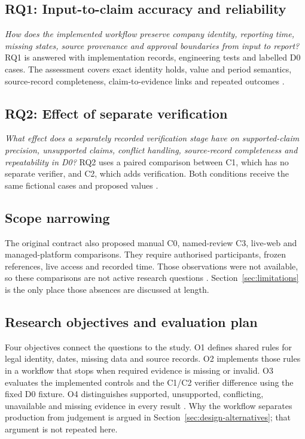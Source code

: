 \subsection*{RQ1: Input-to-claim accuracy and reliability}

\textit{How does the implemented workflow preserve company identity, reporting time, missing states,
source provenance and approval boundaries from input to report?} RQ1 is answered with implementation
records, engineering tests and labelled D0 cases. The assessment covers exact identity holds, value
and period semantics, source-record completeness, claim-to-evidence links and repeated outcomes
\citep{nikiforova2020quality,gao2023alce}.

\subsection*{RQ2: Effect of separate verification}

\textit{What effect does a separately recorded verification stage have on supported-claim precision,
unsupported claims, conflict handling, source-record completeness and repeatability in D0?} RQ2 uses
a paired comparison between C1, which has no separate verifier, and C2, which adds verification.
Both conditions receive the same fictional cases and proposed values
\citep{gao2023alce,gao2023rarr}.

\subsection*{Scope narrowing}

The original contract also proposed manual C0, named-review C3, live-web and managed-platform
comparisons. They require authorised participants, frozen references, live access and recorded time.
Those observations were not available, so these comparisons are not active research questions
\citep{amershi2019guidelines,bucinca2021forcing}. Section~\ref{sec:limitations} is the only place
those absences are discussed at length.

\subsection*{Research objectives and evaluation plan}

Four objectives connect the questions to the study. O1 defines shared rules for legal identity,
dates, missing data and source records. O2 implements those rules in a workflow that stops when
required evidence is missing or invalid. O3 evaluates the implemented controls and the C1/C2 verifier
difference using the fixed D0 fixture. O4 distinguishes supported, unsupported, conflicting,
unavailable and missing evidence in every result
\citep{hevner2004design,peffers2007dsrm}. Why the workflow separates production from judgement is
argued in Section~\ref{sec:design-alternatives}; that argument is not repeated here.

